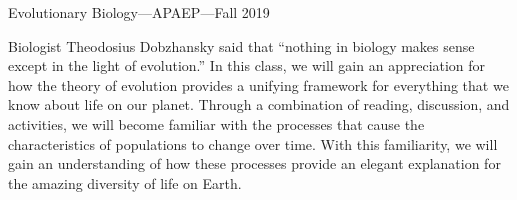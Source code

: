 



\setlength{\parindent}{0.25in}

\begin{mytitle}
    Evolutionary Biology---APAEP---Fall 2019
\end{mytitle}

\bigskip

Biologist Theodosius Dobzhansky said that ``nothing in biology makes sense
except in the light of evolution.''
In this class, we will gain an appreciation for how the theory of evolution
provides a unifying framework for everything that we know about life on our
planet.
Through a combination of reading, discussion, and activities, we will become
familiar with the processes that cause the characteristics of populations to
change over time.
With this familiarity, we will gain an understanding of how these processes
provide an elegant explanation for the amazing diversity of life on Earth.



